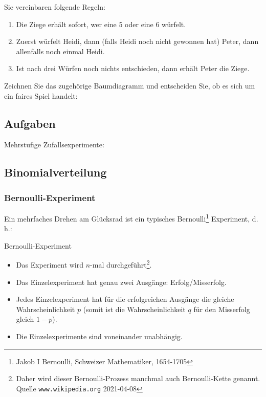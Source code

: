 Sie vereinbaren folgende Regeln:

\begin{enumerate}
\item Die Ziege erhält sofort, wer eine 5 oder eine 6 würfelt.
\item Zuerst würfelt Heidi, dann (falls Heidi noch nicht gewonnen hat) Peter, dann allenfalls noch einmal Heidi.
\item Ist nach drei Würfen noch nichts entschieden, dann erhält Peter die Ziege.
\end{enumerate}


Zeichnen Sie das zugehörige Baumdiagramm und entscheiden Sie, ob es sich um ein faires Spiel handelt:

\newpage




\subsection*{Aufgaben}

Mehrstufige Zufallsexperimente:

\newpage


\subsection{Binomialverteilung}



\subsubsection{Bernoulli-Experiment}
Ein mehrfaches Drehen am Glücksrad ist ein typisches
Bernoulli\footnote{Jakob I Bernoulli, Schweizer Mathematiker,
  1654-1705} Experiment, d.\,h.:

\begin{definition}{Bernoulli-Experiment}{}
\begin{itemize}
\item Das Experiment wird $n$-mal durchgeführt\footnote{Daher wird dieser
Bernoulli-Prozess manchmal auch Bernoulli-Kette genannt. Quelle
\texttt{www.wikipedia.org} 2021-04-08}.
\item Das Einzelexperiment hat genau zwei Ausgänge: Erfolg/Misserfolg.
\item Jedes Einzelexperiment hat für die erfolgreichen Ausgänge die gleiche
      Wahrscheinlichkeit $p$ (somit ist die Wahrscheinlichkeit $q$ für den
      Misserfolg gleich $1-p$).
\item Die Einzelexperimente sind voneinander unabhängig.
\end{itemize}
\end{definition}

